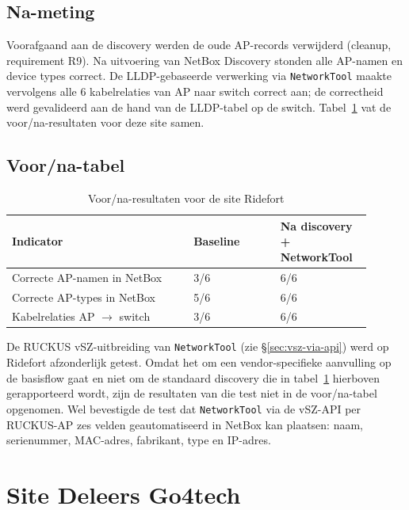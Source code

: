 \subsection{Na-meting}

Voorafgaand aan de discovery werden de oude AP-records verwijderd (cleanup, requirement R9). Na uitvoering van NetBox Discovery stonden alle AP-namen en device types correct. De LLDP-gebaseerde verwerking via \texttt{NetworkTool} maakte vervolgens alle 6 kabelrelaties van AP naar switch correct aan; de correctheid werd gevalideerd aan de hand van de LLDP-tabel op de switch. Tabel~\ref{tab:ridefort-voor-na} vat de voor/na-resultaten voor deze site samen.

\subsection{Voor/na-tabel}

\begin{table}[H]
  \centering
  \caption[Voor/na-resultaten Ridefort]{Voor/na-resultaten voor de site Ridefort}
  \label{tab:ridefort-voor-na}
  \begin{tabular}{p{0.46\linewidth} p{0.22\linewidth} p{0.22\linewidth}}
    \toprule
    \textbf{Indicator} & \textbf{Baseline} & \textbf{Na discovery + NetworkTool} \\
    \midrule
    Correcte AP-namen in NetBox & 3/6 & 6/6 \\
    Correcte AP-types in NetBox & 5/6 & 6/6 \\
    Kabelrelaties AP $\rightarrow$ switch & 3/6 & 6/6 \\
    \bottomrule
  \end{tabular}
\end{table}

De RUCKUS vSZ-uitbreiding van \texttt{NetworkTool} (zie \S\ref{sec:vsz-via-api}) werd op Ridefort afzonderlijk getest. Omdat het om een vendor-specifieke aanvulling op de basisflow gaat en niet om de standaard discovery die in tabel~\ref{tab:ridefort-voor-na} hierboven gerapporteerd wordt, zijn de resultaten van die test niet in de voor/na-tabel opgenomen. Wel bevestigde de test dat \texttt{NetworkTool} via de vSZ-API per RUCKUS-AP zes velden geautomatiseerd in NetBox kan plaatsen: naam, serienummer, MAC-adres, fabrikant, type en IP-adres.

\section{Site Deleers Go4tech}
\label{sec:deleers}

